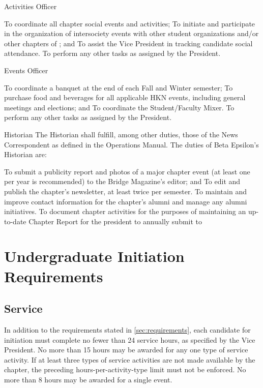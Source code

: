 \begin{enumsubsection}
\item{Activities Officer}
\begin{enumsubsubsection}
\itemnotoc To coordinate all chapter social events and activities;
\itemnotoc To initiate and participate in the organization of intersociety events with other student organizations and/or other chapters of \hkn; and
\itemnotoc To assist the Vice President in tracking candidate social attendance.
\itemnotoc To perform any other tasks as assigned by the President.
\end{enumsubsubsection}

\item{Events Officer}
\begin{enumsubsubsection}
\itemnotoc To coordinate a banquet at the end of each Fall and Winter semester;
\itemnotoc To purchase food and beverages for all applicable HKN events, including general meetings and elections; and
\itemnotoc To coordinate the Student/Faculty Mixer.
\itemnotoc To perform any other tasks as assigned by the President.
\end{enumsubsubsection}

\item{Historian}
The Historian shall fulfill, among other duties, those of the News Correspondent as defined in the \hkn Operations Manual. The duties of Beta Epsilon's Historian are:
\begin{enumsubsubsection}
\itemnotoc To submit a publicity report and photos of a major chapter event (at least one per year is recommended) to the Bridge Magazine's editor; and
\itemnotoc To edit and publish the chapter's newsletter, at least twice per semester.
\itemnotoc To maintain and improve contact information for the chapter's alumni and manage any alumni initiatives.
\itemnotoc To document chapter activities for the purposes of maintaining an up-to-date Chapter Report for the president to annually submit to \hkn
\end{enumsubsubsection}

\end{enumsubsection}

\chapter{Undergraduate Initiation Requirements}\label{app:ugradreqs}

\section{Service}
In addition to the requirements stated in \ref{sec:requirements}, each candidate for initiation must complete no fewer than 24 service hours, as specified by the Vice President.  No more than 15 hours may be awarded for any one type of service activity. If at least three types of service activities are not made available by the chapter, the preceding hours-per-activity-type limit must not be enforced. No more than 8 hours may be awarded for a single event.

